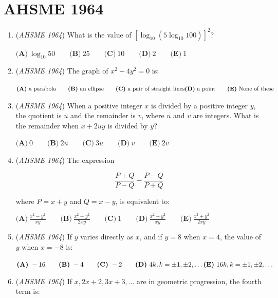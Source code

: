 \section{AHSME 1964}
        \begin{enumerate}
        	\item (\textit{AHSME 1964}) What is the value of $[\log_{10}(5\log_{10}100)]^2$?


 $\textbf{(A)}\ \log_{10}50 \qquad \textbf{(B)}\ 25\qquad \textbf{(C)}\ 10 \qquad \textbf{(D)}\ 2\qquad \textbf{(E)}\ 1$


	\item (\textit{AHSME 1964}) The graph of $x^2-4y^2=0$ is:


 $\textbf{(A)}\ \text{a parabola} \qquad \textbf{(B)}\ \text{an ellipse} \qquad \textbf{(C)}\ \text{a pair of straight lines}\qquad \\ \textbf{(D)}\ \text{a point}\qquad \textbf{(E)}\ \text{None of these}$


	\item (\textit{AHSME 1964}) When a positive integer $x$ is divided by a positive integer $y$, the quotient is $u$ and the remainder is $v$, where $u$ and $v$ are integers. 
What is the remainder when $x+2uy$ is divided by $y$?


 $\textbf{(A)}\ 0 \qquad \textbf{(B)}\ 2u \qquad \textbf{(C)}\ 3u \qquad \textbf{(D)}\ v \qquad \textbf{(E)}\ 2v$


	\item (\textit{AHSME 1964}) The expression


 
 \[\frac{P+Q}{P-Q}-\frac{P-Q}{P+Q}\]


 where $P=x+y$ and $Q=x-y$, is equivalent to:


 $\textbf{(A)}\ \frac{x^2-y^2}{xy}\qquad \textbf{(B)}\ \frac{x^2-y^2}{2xy}\qquad \textbf{(C)}\ 1 \qquad \textbf{(D)}\ \frac{x^2+y^2}{xy}\qquad \textbf{(E)}\ \frac{x^2+y^2}{2xy}$


	\item (\textit{AHSME 1964}) If $y$ varies directly as $x$, and if $y=8$ when $x=4$, the value of $y$ when $x=-8$ is:


 $\textbf{(A)}\ -16 \qquad \textbf{(B)}\ -4 \qquad \textbf{(C)}\ -2 \qquad \textbf{(D)}\ 4k, k= \pm1, \pm2, \dots \qquad \\ \textbf{(E)}\ 16k, k=\pm1,\pm2,\dots$


	\item (\textit{AHSME 1964}) If $x, 2x+2, 3x+3, \dots$ are in geometric progression, the fourth term is:



\end{enumerate}
